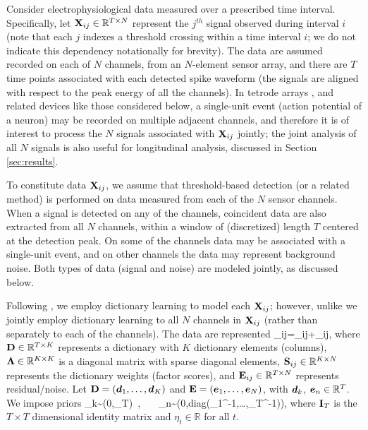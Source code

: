 \documentclass[journal]{IEEEtran}
\newcommand{\Real}{\mathbb{R}}
\begin{document}
Consider electrophysiological data measured over a prescribed time interval. Specifically, let ${\mathbf X}_{ij}\in\mathbb{R}^{T\times N}$ represent the $j${$^{th}$} signal observed during interval $i$ {(note that each $j$ indexes a threshold crossing within a time interval $i$; we do not indicate this dependency notationally for brevity)}. The data are assumed recorded on each of $N$ channels, from an $N$-element sensor array, and there are $T$ time points associated with each detected spike waveform (the signals are aligned with respect to the peak energy of all the channels). In tetrode arrays \cite{tetrode}, and related devices like those considered below, a single-unit event (action potential of a neuron) may be recorded on multiple adjacent channels, and therefore it is of interest to process the $N$ signals associated with ${\mathbf X}_{ij}$ jointly; the joint analysis of all $N$ signals is also useful for {longitudinal analysis}, discussed in Section \ref{sec:results}.

To constitute data ${\mathbf X}_{ij}$, {we assume} that threshold-based detection (or a related method) is performed on data measured from each of the $N$ sensor channels. When a signal is detected on any of the channels, coincident data are also extracted from all $N$ channels, within a window of (discretized) length $T$ {centered at the detection peak}. On some of the channels data may be associated with a single-unit event, and on other channels the data may represent background noise. Both types of data (signal and noise) are modeled jointly, as discussed below.

Following \cite{Bo2011}, we employ dictionary learning to model each ${\mathbf X}_{ij}$; however, unlike \cite{Bo2011} we jointly employ dictionary learning to all $N$ channels in ${\mathbf X}_{ij}$ (rather than separately to each of the channels). The data are represented
\beq\Xmat_{ij}=\Dmat \Lambdamat \Smat_{ij}+\Emat_{ij},\label{eq:basic}\eeq
where ${\mathbf D}\in\mathbb{R}^{T\times K}$ represents a dictionary with $K$ dictionary elements (columns), $\boldsymbol{\Lambda}\in\mathbb{R}^{K\times K}$ is a diagonal matrix with sparse diagonal elements, ${\mathbf S}_{ij}\in\mathbb{R}^{K\times N}$ represents the dictionary weights (factor scores), and ${\mathbf E}_{ij}\in\mathbb{R}^{T\times N}$ represents residual/noise. Let ${\mathbf D}=(\boldsymbol{d}_1,\dots,\boldsymbol{d}_K)$ and ${\mathbf E}=(\boldsymbol{e}_1,\dots,\boldsymbol{e}_N)$, with {$\boldsymbol{d}_k$, $\boldsymbol{e}_n\in\mathbb{R}^T$}. We impose priors
\beq \dv_k\sim{}(0,\Imat_T)~,~~~ \ev_n\sim{}(0,\mbox{diag}(\eta_1^{-1},\dots,\eta_T^{-1})),\eeq
where ${\mathbf I}_T$ is the $T\times T$ dimensional identity matrix {and $\eta_t \in \Real$ for all $t$}.
\end{document}
